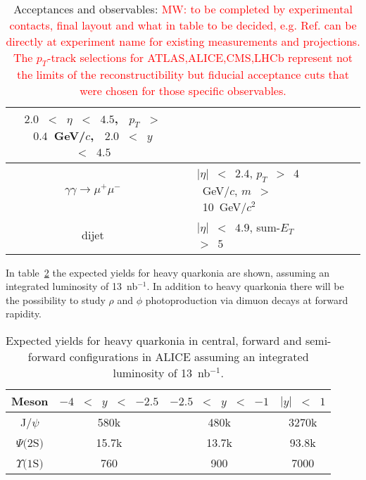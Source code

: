 \documentclass[../report.tex]{subfiles}
\begin{document}
\begin{table}[htbp]
{\begin{tabular}{|c|c|c|c|l|c|c|c|c|}
          &
          $2.0$~$<$~$\eta$~$<$~$4.5$,~
          $p_T$~$>$~$0.4$~GeV/$c$,~
          $2.0$~$<$~$y$~$<$~$4.5$
          \\
          \hline
              {\multirow{2}{*}{ATLAS}} &
              $\gamma\gamma\to \mu^+\mu^-$ &
              {\multirow{2}{*}{PbPb}} &
              {\multirow{2}{*}{\cite{ATLAS:2016vdy}}} &
              $|\eta|$~$<$~$2.4$,
              $p_T$~$>$~$4$~GeV/$c$,
              $m$~$>$~10~GeV/$c^2$
              \\
              &
              dijet &
              &
              &
              $|\eta|$~$<$~$4.9$,
              sum-$E_T$~$>$~$5$
              \\
              \hline
    \end{tabular}
    \caption{Acceptances and observables: \textcolor{red}{MW: to be completed by experimental contacts, final layout and what in table to be decided, e.g. Ref. can be directly at experiment name for existing measurements and projections. The $p_T$-track selections for ATLAS,ALICE,CMS,LHCb represent not the limits of the reconstructibility but fiducial acceptance cuts that were chosen for those specific observables.}  }
    \label{tab:UPCExpRun12}
  }
\end{table}


In table~\ref{tab:ALICERun34Proj} the expected yields for heavy
quarkonia are shown, assuming an integrated luminosity of
13~nb$^{-1}$. In addition to heavy quarkonia there will be the
possibility to study $\rho$ and $\phi$ photoproduction via dimuon
decays at forward rapidity.

\begin{table}[htbp]
  {%
    \centering
    \begin{tabular}{|c|c|c|c|}
      \hline
      Meson & $-4$~$<$~$y$~$<$~$-2.5$ & $-2.5$~$<$~$y$~$<$~$-1$ & $|y|$~$<$~$1$\\\hline
      J/$\psi$         & 580k   & 480k   & 3270k   \\
      $\Psi(2$S$)$     &  15.7k &  13.7k &   93.8k \\
      $\Upsilon(1$S$)$ & 760    & 900    & 7000    \\
      \hline
    \end{tabular}
    \caption{Expected yields for heavy quarkonia in central, forward and semi-forward configurations in ALICE
      assuming an integrated luminosity of 13~nb$^{-1}$.} \label{tab:ALICERun34Proj}
  }
\end{table}
\end{document}
